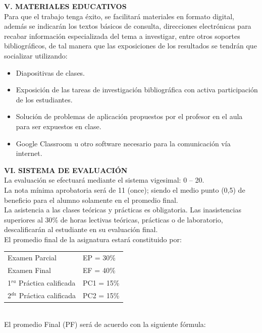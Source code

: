 \documentclass[12pt,a4paper]{article}
\begin{document}
\textbf{V.	MATERIALES EDUCATIVOS}\\
Para que el trabajo tenga éxito, se facilitará materiales en formato digital, además se indicarán los textos básicos de consulta, direcciones electrónicas para recabar información especializada del tema a investigar, entre otros soportes bibliográficos, de tal manera que las exposiciones de los resultados se tendrán que socializar utilizando:
\begin{itemize}
\item Diapositivas de clases. 
\item Exposición de las tareas de investigación bibliográfica con activa participación de los estudiantes.
\item Solución de problemas de aplicación propuestos por el profesor en el aula para ser expuestos en clase.
\item Google Classroom u otro software necesario para la comunicación vía internet.
\end{itemize}


\textbf{VI.	SISTEMA DE EVALUACIÓN}\\
La evaluación se efectuará mediante el sistema vigesimal: 0 – 20.\\
La nota mínima aprobatoria será de 11 (once); siendo el medio punto (0,5) de beneficio para el alumno solamente en el promedio final.\\
La asistencia a las clases teóricas y prácticas es obligatoria. Las inasistencias superiores al 30\% de horas lectivas teóricas, prácticas o de laboratorio, descalificarán al estudiante en su evaluación final.\\
El promedio final de la asignatura estará constituido por:

\begin{tabular}{p{6cm} p{3cm}} 
Examen Parcial 						&	EP	= 30\% \\
Examen Final	                    &   EF	= 40\% \\
1$^{ra}$ Práctica calificada        &   PC1	= 15\% \\
2$^{da}$ Práctica calificada        &   PC2	= 15\% \\
\end{tabular} \\

El promedio Final (PF) será de acuerdo con la siguiente fórmula:

\begin{center}
\end{center}
\end{document}
